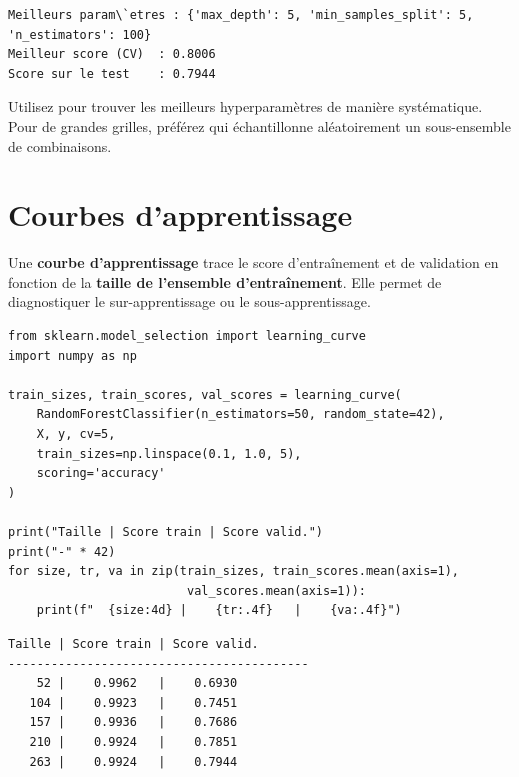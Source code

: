 \begin{codeoutput}
\begin{verbatim}
Meilleurs param\`etres : {'max_depth': 5, 'min_samples_split': 5, 'n_estimators': 100}
Meilleur score (CV)  : 0.8006
Score sur le test    : 0.7944
\end{verbatim}
\end{codeoutput}

\begin{bonnepratique}
Utilisez  pour trouver les meilleurs hyperparam\`etres de mani\`ere syst\'ematique. Pour de grandes grilles, pr\'ef\'erez  qui \'echantillonne al\'eatoirement un sous-ensemble de combinaisons.
\end{bonnepratique}

\section{Courbes d'apprentissage}
\label{sec:learning_curves}


\begin{definition}
Une \textbf{courbe d'apprentissage} trace le score d'entra\^inement et de validation en fonction de la \textbf{taille de l'ensemble d'entra\^inement}. Elle permet de diagnostiquer le sur-apprentissage ou le sous-apprentissage.
\end{definition}

\begin{codeblock}[title=\textbf{Python}]
\begin{verbatim}
from sklearn.model_selection import learning_curve
import numpy as np

train_sizes, train_scores, val_scores = learning_curve(
    RandomForestClassifier(n_estimators=50, random_state=42),
    X, y, cv=5,
    train_sizes=np.linspace(0.1, 1.0, 5),
    scoring='accuracy'
)

print("Taille | Score train | Score valid.")
print("-" * 42)
for size, tr, va in zip(train_sizes, train_scores.mean(axis=1),
                         val_scores.mean(axis=1)):
    print(f"  {size:4d} |    {tr:.4f}   |    {va:.4f}")
\end{verbatim}
\end{codeblock}

\begin{codeoutput}
\begin{verbatim}
Taille | Score train | Score valid.
------------------------------------------
    52 |    0.9962   |    0.6930
   104 |    0.9923   |    0.7451
   157 |    0.9936   |    0.7686
   210 |    0.9924   |    0.7851
   263 |    0.9924   |    0.7944
\end{verbatim}
\end{codeoutput}

